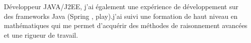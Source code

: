 %
%
%
\par{
Développeur JAVA/J2EE, j'ai également une expérience de développement sur des frameworks Java (Spring , play).j'ai suivi une formation de haut niveau en mathématiques qui me permet d'acquérir des méthodes de raisonnement avancées et une rigueur de travail.
}